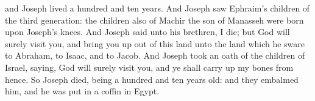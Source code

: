 and Joseph lived a hundred and ten years. And Joseph saw Ephraim’s children of the third generation: the children also of Machir the son of Manasseh were born upon Joseph’s knees. And Joseph said unto his brethren, I die; but God will surely visit you, and bring you up out of this land unto the land which he sware to Abraham, to Isaac, and to Jacob. And Joseph took an oath of the children of Israel, saying, God will surely visit you, and ye shall carry up my bones from hence. So Joseph died, being a hundred and ten years old: and they embalmed him, and he was put in a coffin in Egypt. 